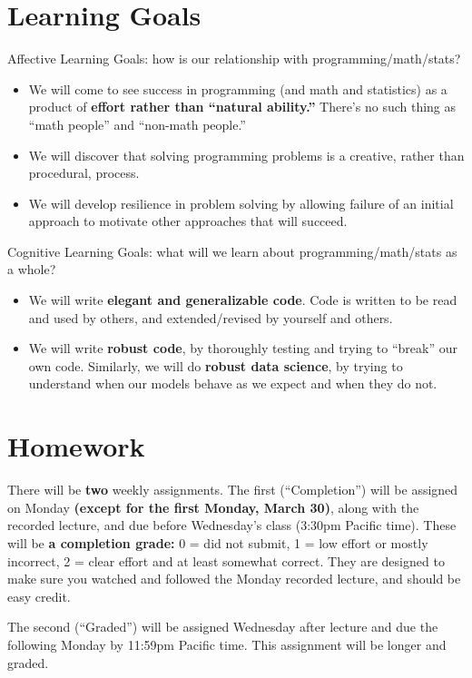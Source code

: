 \documentclass[12pt]{article}
\begin{document}
\section*{Learning Goals}

Affective Learning Goals: how is our relationship with programming/math/stats?
\begin{itemize}
	\item We will come to see success in programming (and math and statistics) as a product of \textbf{effort rather than ``natural ability.''} There's no such thing as ``math people'' and ``non-math people.''
	\item We will discover that solving programming problems is a creative, rather than procedural, process.
	\item We will develop resilience in problem solving by allowing failure of an initial approach to motivate other approaches that will succeed.
\end{itemize}

Cognitive Learning Goals: what will we learn about programming/math/stats as a whole?
\begin{itemize}
	\item We will write \textbf{elegant and generalizable code}. Code is written to be read and used by others, and extended/revised by yourself and others.
	\item We will write \textbf{robust code}, by thoroughly testing and trying to ``break'' our own code. Similarly, we will do \textbf{robust data science}, by trying to understand when our models behave as we expect and when they do not.
\end{itemize}

\section*{Homework}

There will be \textbf{two} weekly assignments. The first (``Completion'') will be assigned on Monday \textbf{(except for the first Monday, March 30)}, along with the recorded lecture, and due before Wednesday's class (3:30pm Pacific time). These will be \textbf{a completion grade:} 0 = did not submit, 1 = low effort or mostly incorrect, 2 = clear effort and at least somewhat correct. They are designed to make sure you watched and followed the Monday recorded lecture, and should be easy credit.

The second (``Graded'') will be assigned Wednesday after lecture and due the following Monday by 11:59pm Pacific time. This assignment will be longer and graded.
\end{document}
